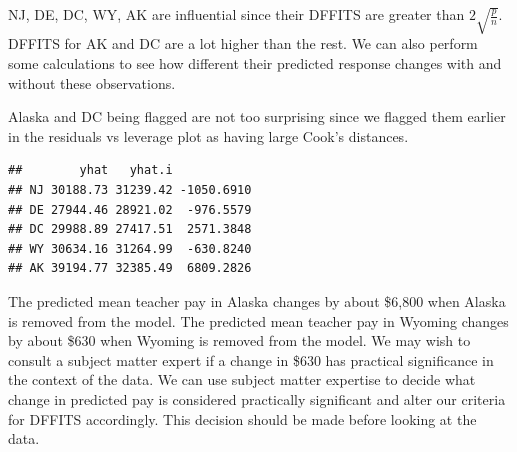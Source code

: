 \documentclass[
]{book}
\newenvironment{Shaded}{\begin{snugshade}}{\end{snugshade}}
\newcommand{\DecValTok}[1]{\textcolor[rgb]{0.00,0.00,0.81}{#1}}
\newcommand{\DocumentationTok}[1]{\textcolor[rgb]{0.56,0.35,0.01}{\textbf{\textit{#1}}}}
\newcommand{\FunctionTok}[1]{\textcolor[rgb]{0.13,0.29,0.53}{\textbf{#1}}}
\newcommand{\NormalTok}[1]{#1}
\newcommand{\OtherTok}[1]{\textcolor[rgb]{0.56,0.35,0.01}{#1}}
\newcommand{\SpecialCharTok}[1]{\textcolor[rgb]{0.81,0.36,0.00}{\textbf{#1}}}
\begin{document}
NJ, DE, DC, WY, AK are influential since their DFFITS are greater than \(2\sqrt{\frac{p}{n}}\). DFFITS for AK and DC are a lot higher than the rest. We can also perform some calculations to see how different their predicted response changes with and without these observations.

Alaska and DC being flagged are not too surprising since we flagged them earlier in the residuals vs leverage plot as having large Cook's distances.

\begin{Shaded}
\end{Shaded}

\begin{verbatim}
##        yhat   yhat.i           
## NJ 30188.73 31239.42 -1050.6910
## DE 27944.46 28921.02  -976.5579
## DC 29988.89 27417.51  2571.3848
## WY 30634.16 31264.99  -630.8240
## AK 39194.77 32385.49  6809.2826
\end{verbatim}

The predicted mean teacher pay in Alaska changes by about \$6,800 when Alaska is removed from the model. The predicted mean teacher pay in Wyoming changes by about \$630 when Wyoming is removed from the model. We may wish to consult a subject matter expert if a change in \$630 has practical significance in the context of the data. We can use subject matter expertise to decide what change in predicted pay is considered practically significant and alter our criteria for DFFITS accordingly. This decision should be made before looking at the data.
\end{document}

